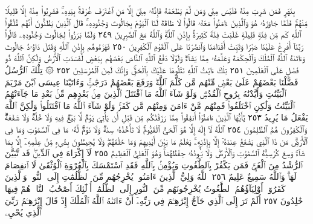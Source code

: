 بِنَهَرࣲ فَمَن شَرِبَ مِنْهُ فَلَيْسَ مِنِّي وَمَن لَّمْ يَطْعَمْهُ
فَإِنَّهُۥ مِنِّيٓ إِلَّا مَنِ ٱغْتَرَفَ غُرْفَةَۢ بِيَدِهِۦۚ فَشَرِبُوا۟ مِنْهُ
إِلَّا قَلِيلࣰا مِّنْهُمْۚ فَلَمَّا جَاوَزَهُۥ هُوَ وَٱلَّذِينَ ءَامَنُوا۟
مَعَهُۥ قَالُوا۟ لَا طَاقَةَ لَنَا ٱلْيَوْمَ بِجَالُوتَ وَجُنُودِهِۦۚ
قَالَ ٱلَّذِينَ يَظُنُّونَ أَنَّهُم مُّلَٰقُوا۟ ٱللَّهِ كَم مِّن فِئَةࣲ
قَلِيلَةٍ غَلَبَتْ فِئَةࣰ كَثِيرَةَۢ بِإِذْنِ ٱللَّهِۗ وَٱللَّهُ مَعَ
ٱلصَّٰبِرِينَ ٢٤٩ وَلَمَّا بَرَزُوا۟ لِجَالُوتَ وَجُنُودِهِۦ قَالُوا۟
رَبَّنَآ أَفْرِغْ عَلَيْنَا صَبْرࣰا وَثَبِّتْ أَقْدَامَنَا وَٱنصُرْنَا
عَلَى ٱلْقَوْمِ ٱلْكَٰفِرِينَ ٢٥٠ فَهَزَمُوهُم بِإِذْنِ ٱللَّهِ
وَقَتَلَ دَاوُۥدُ جَالُوتَ وَءَاتَىٰهُ ٱللَّهُ ٱلْمُلْكَ
وَٱلْحِكْمَةَ وَعَلَّمَهُۥ مِمَّا يَشَآءُۗ وَلَوْلَا دَفْعُ ٱللَّهِ ٱلنَّاسَ
بَعْضَهُم بِبَعْضࣲ لَّفَسَدَتِ ٱلْأَرْضُ وَلَٰكِنَّ ٱللَّهَ ذُو
فَضْلٍ عَلَى ٱلْعَٰلَمِينَ ٢٥١ تِلْكَ ءَايَٰتُ ٱللَّهِ نَتْلُوهَا
عَلَيْكَ بِٱلْحَقِّۚ وَإِنَّكَ لَمِنَ ٱلْمُرْسَلِينَ ٢٥٢
۞ تِلْكَ ٱلرُّسُلُ فَضَّلْنَا بَعْضَهُمْ عَلَىٰ بَعْضࣲۘ مِّنْهُم مَّن كَلَّمَ ٱللَّهُۖ
وَرَفَعَ بَعْضَهُمْ دَرَجَٰتࣲۚ وَءَاتَيْنَا عِيسَى ٱبْنَ مَرْيَمَ ٱلْبَيِّنَٰتِ
وَأَيَّدْنَٰهُ بِرُوحِ ٱلْقُدُسِۗ وَلَوْ شَآءَ ٱللَّهُ مَا ٱقْتَتَلَ ٱلَّذِينَ مِنۢ
بَعْدِهِم مِّنۢ بَعْدِ مَا جَآءَتْهُمُ ٱلْبَيِّنَٰتُ وَلَٰكِنِ ٱخْتَلَفُوا۟
فَمِنْهُم مَّنْ ءَامَنَ وَمِنْهُم مَّن كَفَرَۚ وَلَوْ شَآءَ ٱللَّهُ مَا ٱقْتَتَلُوا۟
وَلَٰكِنَّ ٱللَّهَ يَفْعَلُ مَا يُرِيدُ ٢٥٣ يَٰٓأَيُّهَا ٱلَّذِينَ ءَامَنُوٓا۟ أَنفِقُوا۟
مِمَّا رَزَقْنَٰكُم مِّن قَبْلِ أَن يَأْتِيَ يَوْمࣱ لَّا بَيْعࣱ فِيهِ وَلَا خُلَّةࣱ وَلَا
شَفَٰعَةࣱۗ وَٱلْكَٰفِرُونَ هُمُ ٱلظَّٰلِمُونَ ٢٥٤ ٱللَّهُ لَآ إِلَٰهَ إِلَّا هُوَ
ٱلْحَيُّ ٱلْقَيُّومُۚ لَا تَأْخُذُهُۥ سِنَةࣱ وَلَا نَوْمࣱۚ لَّهُۥ مَا فِي ٱلسَّمَٰوَٰتِ
وَمَا فِي ٱلْأَرْضِۗ مَن ذَا ٱلَّذِي يَشْفَعُ عِندَهُۥٓ إِلَّا بِإِذْنِهِۦۚ يَعْلَمُ
مَا بَيْنَ أَيْدِيهِمْ وَمَا خَلْفَهُمْۖ وَلَا يُحِيطُونَ بِشَيْءࣲ مِّنْ عِلْمِهِۦٓ إِلَّا
بِمَا شَآءَۚ وَسِعَ كُرْسِيُّهُ ٱلسَّمَٰوَٰتِ وَٱلْأَرْضَۖ وَلَا يَـُٔودُهُۥ حِفْظُهُمَاۚ
وَهُوَ ٱلْعَلِيُّ ٱلْعَظِيمُ ٢٥٥ لَآ إِكْرَاهَ فِي ٱلدِّينِۖ قَد تَّبَيَّنَ ٱلرُّشْدُ مِنَ
ٱلْغَيِّۚ فَمَن يَكْفُرْ بِٱلطَّٰغُوتِ وَيُؤْمِنۢ بِٱللَّهِ فَقَدِ ٱسْتَمْسَكَ
بِٱلْعُرْوَةِ ٱلْوُثْقَىٰ لَا ٱنفِصَامَ لَهَاۗ وَٱللَّهُ سَمِيعٌ عَلِيمٌ ٢٥٦
ٱللَّهُ وَلِيُّ ٱلَّذِينَ ءَامَنُوا۟ يُخْرِجُهُم مِّنَ ٱلظُّلُمَٰتِ إِلَى ٱلنُّورِۖ
وَٱلَّذِينَ كَفَرُوٓا۟ أَوْلِيَآؤُهُمُ ٱلطَّٰغُوتُ يُخْرِجُونَهُم مِّنَ
ٱلنُّورِ إِلَى ٱلظُّلُمَٰتِۗ أُو۟لَٰٓئِكَ أَصْحَٰبُ ٱلنَّارِۖ هُمْ فِيهَا
خَٰلِدُونَ ٢٥٧ أَلَمْ تَرَ إِلَى ٱلَّذِي حَآجَّ إِبْرَٰهِـۧمَ فِي رَبِّهِۦٓ
أَنْ ءَاتَىٰهُ ٱللَّهُ ٱلْمُلْكَ إِذْ قَالَ إِبْرَٰهِـۧمُ رَبِّيَ ٱلَّذِي يُحْيِۦ
